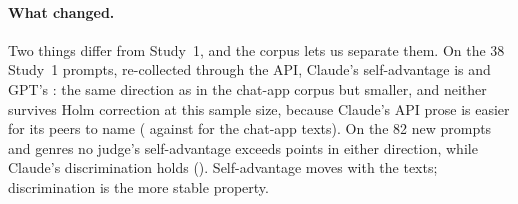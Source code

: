 \paragraph{What changed.} Two things differ from Study~1, and the corpus
lets us separate them. On the 38 Study~1 prompts, re-collected through the
API, Claude's self-advantage is \FXOldClaudeLineupAdv{} and GPT's
\FXOldGPTLineupAdv{}: the same direction as in the chat-app corpus but
smaller, and neither survives Holm correction at this sample size, because
Claude's API prose is easier for its peers to name (\FXOldClaudeLineupPeer{}
against \ClaudePeerLineup{} for the chat-app texts). On the 82 new prompts and genres no
judge's self-advantage exceeds \FXNewLineupMaxAbsAdv{} points in either
direction, while Claude's discrimination holds (\FXNewClaudeLineupDisc{}).
Self-advantage moves with the texts; discrimination is the more stable
property.
